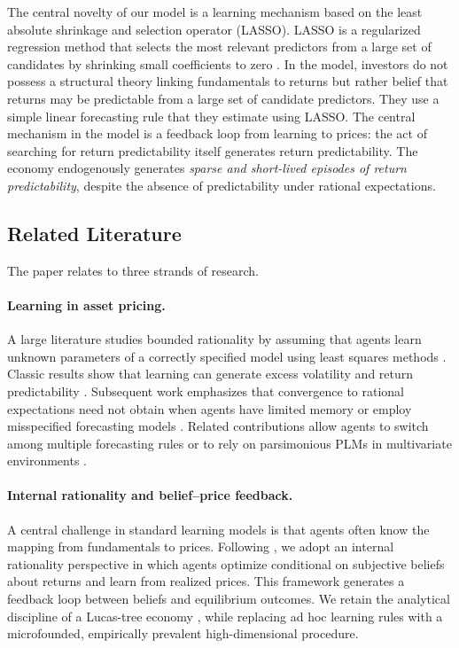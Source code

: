 \documentclass[11pt]{article}
\begin{document}
The central novelty of our model is a learning mechanism based on the least absolute shrinkage and selection operator (LASSO).
LASSO is a regularized regression method that selects the most relevant predictors from a large set of candidates by shrinking small coefficients to zero \citep{Tibshirani1996}.
In the model, investors do not possess a structural theory linking fundamentals to returns but rather belief that returns may be predictable from a large set of candidate predictors.
They use a simple linear forecasting rule that they estimate using LASSO.
The central mechanism in the model is a feedback loop from learning to prices: the act of searching for return predictability itself generates return predictability.
The economy endogenously generates \emph{sparse and short-lived episodes of return predictability}, despite the absence of predictability under rational expectations.

\subsection*{Related Literature}

The paper relates to three strands of research.

\paragraph{Learning in asset pricing.}
A large literature studies bounded rationality by assuming that agents learn unknown parameters of a correctly specified model using least squares methods \citep{Marcet1989}.
Classic results show that learning can generate excess volatility and return predictability \citep{Timmermann1993,Timmermann1996}.
Subsequent work emphasizes that convergence to rational expectations need not obtain when agents have limited memory or employ misspecified forecasting models \citep{Honkapohja2003}.
Related contributions allow agents to switch among multiple forecasting rules or to rely on parsimonious PLMs in multivariate environments \citep{barberis1998model,hong2007simple,Branch2010}.

\paragraph{Internal rationality and belief--price feedback.}
A central challenge in standard learning models is that agents often know the mapping from fundamentals to prices.
Following \cite{Adam2016}, we adopt an internal rationality perspective in which agents optimize conditional on subjective beliefs about returns and learn from realized prices.
This framework generates a feedback loop between beliefs and equilibrium outcomes.
We retain the analytical discipline of a Lucas-tree economy \citep{Lucas1978}, while replacing ad hoc learning rules with a microfounded, empirically prevalent high-dimensional procedure.
\end{document}
